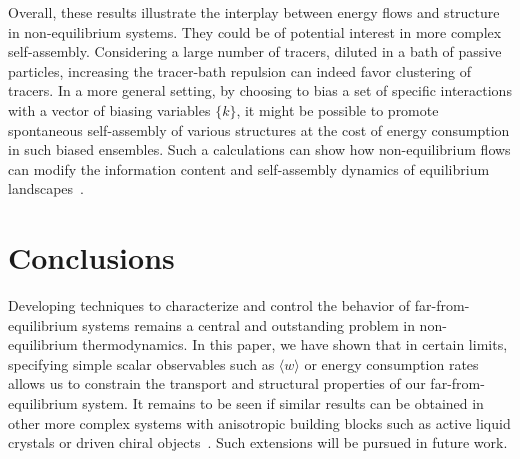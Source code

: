 \documentclass[pre, superscriptaddress, twocolumn,pre]{revtex4-1}
\begin{document}
Overall, these results illustrate the interplay between energy flows and structure in non-equilibrium systems. They could be of potential interest in more complex self-assembly. Considering a large number of tracers, diluted in a bath of passive particles, increasing the tracer-bath repulsion can indeed favor clustering of tracers. In a more general setting, by choosing to bias a set of specific interactions with a vector of biasing variables $\{k\}$, it might be possible to promote spontaneous self-assembly of various structures at the cost of energy consumption in such biased ensembles. Such a calculations can show how non-equilibrium flows can modify the information content and self-assembly dynamics of equilibrium landscapes~\cite{Murugan2015}.







\section{Conclusions}

Developing techniques to characterize and control the behavior of far-from- equilibrium systems remains a central and outstanding problem in non-equilibrium thermodynamics. In this paper, we have shown that in certain limits, specifying simple scalar observables such as $\langle w \rangle$ or energy consumption rates allows us to constrain the transport and structural properties of our far-from-equilibrium system. It remains to be seen if similar results can be obtained in other more complex systems with anisotropic building blocks such as active liquid crystals or driven chiral objects~\cite{Joshi2017, vanZuiden2016, Nguyen2014b}. Such extensions will be pursued in future work.




\end{document}
